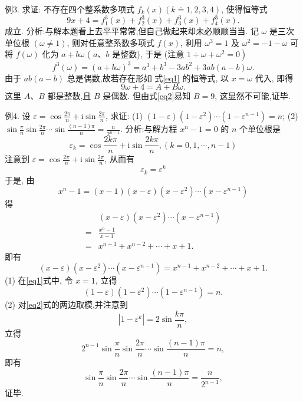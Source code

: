 例3. 求证: 不存在四个整系数多项式 $f_k(x)(k \doteq 1,2,3,4)$, 使得恒等式
$$
9 x+4=f_1^3(x)+f_2^3(x)+f_3^3(x)+f_4^3(x) . \label{eq1}
$$
成立.
分析:与解本题看上去平平常常,但自己做起来却未必顺顺当当.
记 $\omega$ 是三次单位根 $(\omega \neq 1)$, 则对任意整系数多项式 $f(x)$, 利用 $\omega^3=1$ 及 $\omega^2=-1-\omega$ 可将 $f(\omega)$ 化为 $a+b \omega$ ( $a 、 b$ 是整数), 于是 (注意 $\left.1+\omega+\omega^2=0\right)$
$$
f^3(\omega)=(a+b \omega)^3=a^3+b^3-3 a b^2+3 a b(a-b) \omega .
$$
由于 $a b(a-b)$ 总是偶数,故若存在形如 式\ref{eq1} 的恒等式, 以 $x=\omega$ 代入, 即得
$$
9 \omega+4=A+B \omega . \label{eq2}
$$
这里 $A 、 B$ 都是整数,且 $B$ 是偶数.
但由式\ref{eq2}易知 $B=9$, 这显然不可能,证毕.



例4. 设 $\varepsilon=\cos \frac{2 \pi}{n}+\mathrm{i} \sin \frac{2 \pi}{n}$, 求证:
(1) $(1-\varepsilon)\left(1-\varepsilon^2\right) \cdots\left(1-\varepsilon^{n-1}\right)=n$;
(2) $\sin \frac{\pi}{n} \sin \frac{2 \pi}{n} \cdots \sin \frac{(n-1) \pi}{n}=\frac{n}{2^{n-1}}$.
分析:与解方程 $x^n-1=0$ 的 $n$ 个单位根是
$$
\varepsilon_k=\cos \frac{2 k \pi}{n}+\mathrm{i} \sin \frac{2 k \pi}{n},(k=0,1, \cdots, n-1)
$$
注意到 $\varepsilon=\cos \frac{2 \pi}{n}+\mathrm{i} \sin \frac{2 \pi}{n}$, 从而有
$$
\varepsilon_k=\varepsilon^k
$$
于是, 由
$$
x^n-1=(x-1)(x-\varepsilon)\left(x-\varepsilon^2\right) \cdots\left(x-\varepsilon^{n-1}\right)
$$
得
$$
\begin{aligned}
& (x-\varepsilon)\left(x-\varepsilon^2\right) \cdots\left(x-\varepsilon^{n-1}\right) \\
= & \frac{x^n-1}{x-1} \\
= & x^{n-1}+x^{n-2}+\cdots+x+1 .
\end{aligned}
$$
即有
$$
(x-\varepsilon)\left(x-\varepsilon^2\right) \cdots\left(x-\varepsilon^{n-1}\right)=x^{n-1}+x^{n-2}+\cdots+x+1 . \label{eq1}
$$
(1) 在\ref{eq1}式中, 令 $x=1$, 立得
$$
(1-\varepsilon)\left(1-\varepsilon^2\right) \cdots\left(1-\varepsilon^{n-1}\right)=n . \label{eq2}
$$
(2) 对\ref{eq2}式的两边取模,并注意到
$$
\left|1-\varepsilon^k\right|=2 \sin \frac{k \pi}{n},
$$
立得
$$
2^{n-1} \sin \frac{\pi}{n} \sin \frac{2 \pi}{n} \cdots \sin \frac{(n-1) \pi}{n}=n,
$$
即有
$$
\sin \frac{\pi}{n} \sin \frac{2 \pi}{n} \cdots \sin \frac{(n-1) \pi}{n}=\frac{n}{2^{n-1}},
$$
证毕.



